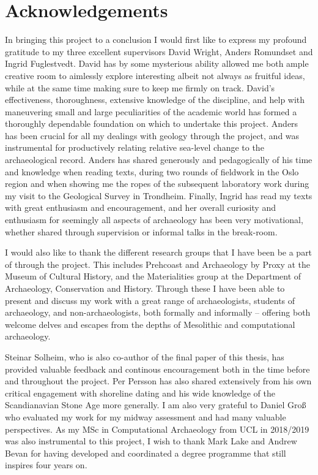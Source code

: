 \pagestyle{plain}
\setcounter{page}{3}

\section*{Acknowledgements}
In bringing this project to a conclusion I would first like to express my profound gratitude to my three excellent supervisors David Wright, Anders Romundset and Ingrid Fuglestvedt. David has by some mysterious ability allowed me both ample creative room to aimlessly explore interesting albeit not always as fruitful ideas, while at the same time making sure to keep me firmly on track. David's effectiveness, thoroughness, extensive knowledge of the discipline, and help with maneuvering small and large peculiarities of the academic world has formed a thoroughly dependable foundation on which to undertake this project. Anders has been crucial for all my dealings with geology through the project, and was instrumental for productively relating relative sea-level change to the archaeological record. Anders has shared generously and pedagogically of his time and knowledge when reading texts, during two rounds of fieldwork in the Oslo region and when showing me the ropes of the subsequent laboratory work during my visit to the Geological Survey in Trondheim. Finally, Ingrid has read my texts with great enthusiasm and encouragement, and her overall curiosity and enthusiasm for seemingly all aspects of archaeology has been very motivational, whether shared through supervision or informal talks in the break-room.

I would also like to thank the different research groups that I have been be a part of through the project. This includes Prehcoast and Archaeology by Proxy at the Museum of Cultural History, and the Materialities group at the Department of Archaeology, Conservation and History. Through these I have been able to present and discuss my work with a great range of archaeologists, students of archaeology, and non-archaeologists, both formally and informally -- offering both welcome delves and escapes from the depths of Mesolithic and computational archaeology.

Steinar Solheim, who is also co-author of the final paper of this thesis, has provided valuable feedback and continous encouragement both in the time before and throughout the project. Per Persson has also shared extensively from his own critical engagement with shoreline dating and his wide knowledge of the Scandianavian Stone Age more generally. I am also very grateful to Daniel Groß who evaluated my work for my midway assessment and had many valuable perspectives. As my MSc in Computational Archaeology from UCL in 2018/2019 was also instrumental to this project, I wish to thank Mark Lake and Andrew Bevan for having developed and coordinated a degree programme that still inspires four years on.

